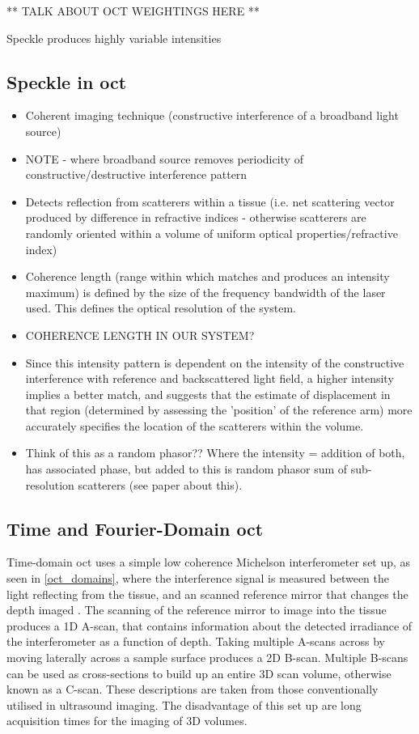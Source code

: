 ** TALK ABOUT OCT WEIGHTINGS HERE **

Speckle produces highly variable intensities

\subsection{Speckle in \ac{oct}}
\begin{itemize}
	\item Coherent imaging technique (constructive interference of a broadband light source)
	\item NOTE - where broadband source removes periodicity of constructive/destructive interference pattern
	\item Detects reflection from scatterers within a tissue (i.e. net scattering vector produced by difference in refractive indices - otherwise scatterers are randomly oriented within a volume of uniform optical properties/refractive index)
	\item Coherence length (range within which matches and produces an intensity maximum) is defined by the size of the frequency bandwidth of the laser used. This defines the optical resolution of the system.
	\item COHERENCE LENGTH IN OUR SYSTEM?
	\item Since this intensity pattern is dependent on the intensity of the constructive interference with reference and backscattered light field, a higher intensity implies a better match, and suggests that the estimate of displacement in that region (determined by assessing the 'position' of the reference arm) more accurately specifies the location of the scatterers within the volume.
	\item Think of this as a random phasor?? Where the intensity = addition of both, has associated phase, but added to this is random phasor sum of sub-resolution scatterers (see paper about this).
\end{itemize}

\subsection{Time and Fourier-Domain \ac{oct}}
Time-domain \ac{oct} uses a simple low coherence Michelson interferometer set up, as seen in \autoref{oct_domains}, where the interference signal is measured between the light reflecting from the tissue, and an scanned reference mirror that changes the depth imaged \cite{huang_optical_1991}. The scanning of the reference mirror to image into the tissue produces a 1D A-scan, that contains information about the detected irradiance of the interferometer as a function of depth. Taking multiple A-scans across by moving laterally across a sample surface produces a 2D B-scan. Multiple B-scans can be used as cross-sections to build up an entire 3D scan volume, otherwise known as a C-scan. These descriptions are taken from those conventionally utilised in ultrasound imaging. The disadvantage of this set up are long acquisition times for the imaging of 3D volumes.

